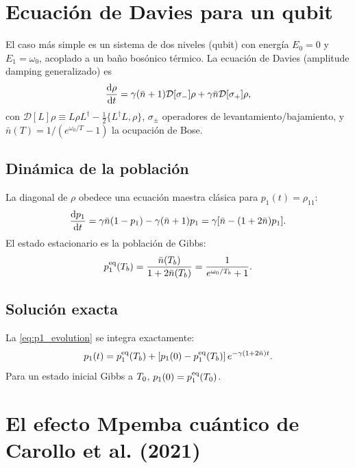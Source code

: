 \section{Ecuación de Davies para un qubit}

El caso más simple es un sistema de dos niveles (qubit) con energía $E_0 = 0$ y 
$E_1 = \omega_0$, acoplado a un baño bosónico térmico. La ecuación de Davies 
(amplitude damping generalizado) es
\begin{equation}
    \dv{\rho}{t} = \gamma (\bar{n}+1) \mathcal{D}[\sigma_{-}] \rho 
    + \gamma \bar{n} \mathcal{D}[\sigma_{+}] \rho,
    \label{eq:davies}
\end{equation}
%
con $\mathcal{D}[L]\rho \equiv L \rho L^{\dagger} - \tfrac{1}{2}\{L^{\dagger} L, \rho\}$, 
$\sigma_{\pm}$ operadores de levantamiento/bajamiento, y 
$\bar{n}(T) = 1/(e^{\omega_0/T} - 1)$ la ocupación de Bose.

\subsection{Dinámica de la población}

La diagonal de $\rho$ obedece una ecuación maestra clásica para $p_1(t) = \rho_{11}$:
\begin{equation}
    \dv{p_1}{t} = \gamma \bar{n} (1 - p_1) - \gamma (\bar{n}+1) p_1 
    = \gamma [\bar{n} - (1 + 2\bar{n}) p_1].
    \label{eq:p1_evolution}
\end{equation}
%
El estado estacionario es la población de Gibbs:
\begin{equation}
    p_1^{\mathrm{eq}}(T_{b}) = \frac{\bar{n}(T_{b})}{1 + 2 \bar{n}(T_{b})} = \frac{1}{e^{\omega_0/T_{b}} + 1}.
    \label{eq:p1_gibbs}
\end{equation}

\subsection{Solución exacta}

La \cref{eq:p1_evolution} se integra exactamente:
\begin{equation}
    p_1(t) = p_1^{\mathrm{eq}}(T_{b}) + \left[p_1(0) - p_1^{\mathrm{eq}}(T_{b})\right] e^{-\gamma(1+2\bar{n}) t}.
\end{equation}
%
Para un estado inicial Gibbs a $T_{0}$, $p_1(0) = p_1^{\mathrm{eq}}(T_{0})$.

\section{El efecto Mpemba cuántico de Carollo et al. (2021)}

